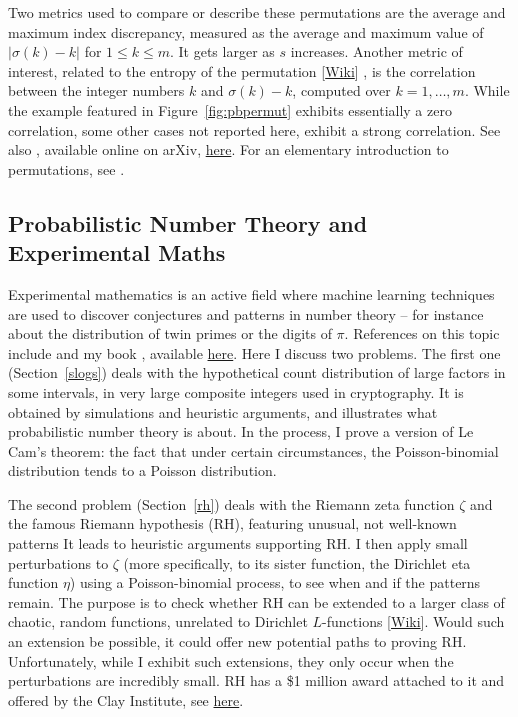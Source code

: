 \documentclass[10pt]{article}
\begin{document}
Two metrics used to compare or describe these permutations are the average and maximum \textcolor{index}{index discrepancy}, measured as the average and maximum value of $|\sigma(k)-k|$ for $1\leq k \leq m$. It gets larger as $s$ increases. Another metric of interest, related to the
\textcolor{index}{entropy} of the permutation
 [\href{https://www.aptech.com/blog/permutation-entropy/}{Wiki}] \cite {pentropy},
is the
correlation between the integer numbers $k$ and $\sigma(k)-k$, computed over $k=1,\dots,m$.
While the example featured in Figure~\ref{fig:pbpermut} exhibits essentially a zero correlation, some other cases not reported here, exhibit a strong correlation. See also \cite{pentrop2}, available online on arXiv, \href{https://arxiv.org/abs/2003.13728}{here}. For an elementary introduction to permutations, see \cite{introp}.


\subsection{Probabilistic Number Theory and Experimental Maths}

Experimental mathematics is an active field where machine learning techniques are used to discover conjectures and patterns in number theory -- for instance about the distribution of twin primes or the digits of $\pi$. References on this topic include \cite{nt1,nt2,nt3} and my book \cite{vgdyn},
available \href{https://github.com/VincentGranville/Stochastic-Processes}{here}. Here I discuss two problems. The first one
(Section~\ref{slogs}) deals with the hypothetical count distribution of large factors  in some intervals, in very large composite integers used in cryptography. It is obtained by simulations and heuristic arguments, and illustrates what probabilistic number theory is about. In the process, I prove a version of Le Cam's theorem: the fact that under certain circumstances, the Poisson-binomial distribution tends to a Poisson distribution.


The second problem (Section~\ref{rh}) deals with the \textcolor{index}{Riemann zeta function} $\zeta$ and the famous Riemann hypothesis (RH), featuring unusual, not well-known patterns  It leads to heuristic arguments supporting RH. I then apply small perturbations to $\zeta$ (more specifically, to its sister function, the \textcolor{index}{Dirichlet eta function} $\eta$) using a Poisson-binomial process, to see when and if the patterns remain. The purpose is to check whether RH can be extended to a larger class of chaotic,
\textcolor{index}{random functions},
unrelated to Dirichlet $L$-functions [\href{https://en.wikipedia.org/wiki/L-function}{Wiki}]. Would such an extension be possible, it could offer new potential paths to proving RH. Unfortunately, while I exhibit such extensions, they only occur when the perturbations are incredibly small. RH has a \$1 million award attached to it and offered by the Clay Institute, see \href{https://www.claymath.org/millennium-problems/}{here}.
\end{document}
